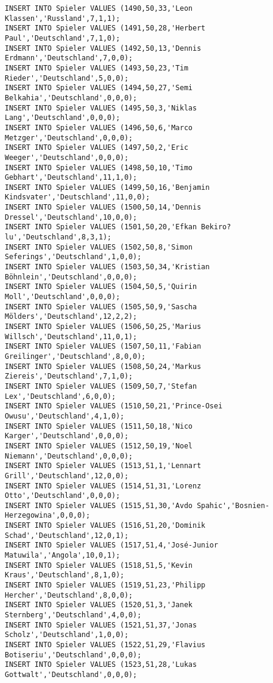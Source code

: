 \documentclass{bschlangaul-aufgabe}
\begin{document}
\begin{verbatim}
INSERT INTO Spieler VALUES (1490,50,33,'Leon Klassen','Russland',7,1,1);
INSERT INTO Spieler VALUES (1491,50,28,'Herbert Paul','Deutschland',7,1,0);
INSERT INTO Spieler VALUES (1492,50,13,'Dennis Erdmann','Deutschland',7,0,0);
INSERT INTO Spieler VALUES (1493,50,23,'Tim Rieder','Deutschland',5,0,0);
INSERT INTO Spieler VALUES (1494,50,27,'Semi Belkahia','Deutschland',0,0,0);
INSERT INTO Spieler VALUES (1495,50,3,'Niklas Lang','Deutschland',0,0,0);
INSERT INTO Spieler VALUES (1496,50,6,'Marco Metzger','Deutschland',0,0,0);
INSERT INTO Spieler VALUES (1497,50,2,'Eric Weeger','Deutschland',0,0,0);
INSERT INTO Spieler VALUES (1498,50,10,'Timo Gebhart','Deutschland',11,1,0);
INSERT INTO Spieler VALUES (1499,50,16,'Benjamin Kindsvater','Deutschland',11,0,0);
INSERT INTO Spieler VALUES (1500,50,14,'Dennis Dressel','Deutschland',10,0,0);
INSERT INTO Spieler VALUES (1501,50,20,'Efkan Bekiro?lu','Deutschland',8,3,1);
INSERT INTO Spieler VALUES (1502,50,8,'Simon Seferings','Deutschland',1,0,0);
INSERT INTO Spieler VALUES (1503,50,34,'Kristian Böhnlein','Deutschland',0,0,0);
INSERT INTO Spieler VALUES (1504,50,5,'Quirin Moll','Deutschland',0,0,0);
INSERT INTO Spieler VALUES (1505,50,9,'Sascha Mölders','Deutschland',12,2,2);
INSERT INTO Spieler VALUES (1506,50,25,'Marius Willsch','Deutschland',11,0,1);
INSERT INTO Spieler VALUES (1507,50,11,'Fabian Greilinger','Deutschland',8,0,0);
INSERT INTO Spieler VALUES (1508,50,24,'Markus Ziereis','Deutschland',7,1,0);
INSERT INTO Spieler VALUES (1509,50,7,'Stefan Lex','Deutschland',6,0,0);
INSERT INTO Spieler VALUES (1510,50,21,'Prince-Osei Owusu','Deutschland',4,1,0);
INSERT INTO Spieler VALUES (1511,50,18,'Nico Karger','Deutschland',0,0,0);
INSERT INTO Spieler VALUES (1512,50,19,'Noel Niemann','Deutschland',0,0,0);
INSERT INTO Spieler VALUES (1513,51,1,'Lennart Grill','Deutschland',12,0,0);
INSERT INTO Spieler VALUES (1514,51,31,'Lorenz Otto','Deutschland',0,0,0);
INSERT INTO Spieler VALUES (1515,51,30,'Avdo Spahic','Bosnien-Herzegowina',0,0,0);
INSERT INTO Spieler VALUES (1516,51,20,'Dominik Schad','Deutschland',12,0,1);
INSERT INTO Spieler VALUES (1517,51,4,'José-Junior Matuwila','Angola',10,0,1);
INSERT INTO Spieler VALUES (1518,51,5,'Kevin Kraus','Deutschland',8,1,0);
INSERT INTO Spieler VALUES (1519,51,23,'Philipp Hercher','Deutschland',8,0,0);
INSERT INTO Spieler VALUES (1520,51,3,'Janek Sternberg','Deutschland',4,0,0);
INSERT INTO Spieler VALUES (1521,51,37,'Jonas Scholz','Deutschland',1,0,0);
INSERT INTO Spieler VALUES (1522,51,29,'Flavius Botiseriu','Deutschland',0,0,0);
INSERT INTO Spieler VALUES (1523,51,28,'Lukas Gottwalt','Deutschland',0,0,0);

\end{verbatim}
\end{document}
